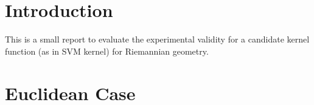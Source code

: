 \section{Introduction}

This is a small report to evaluate the experimental validity for a candidate kernel function (as in SVM kernel) for Riemannian geometry. 

\section{Euclidean Case}
